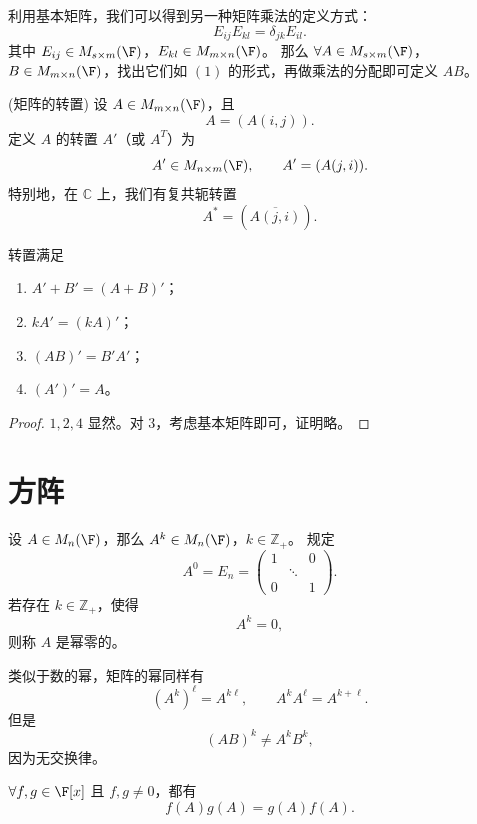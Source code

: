 利用基本矩阵，我们可以得到另一种矩阵乘法的定义方式：
\[
E_{ij}E_{kl}=\delta_{jk}E_{il}.
\]
其中 $E_{ij}\in M_{s\times m}(\F)$，$E_{kl}\in M_{m\times n}(\F)$。
那么 $\forall A\in M_{s\times m}(\F)$，$B\in M_{m\times n}(\F)$，找出它们如 $(1)$ 的形式，再做乘法的分配即可定义 $AB$。
\begin{definition}(矩阵的转置)\label{p1:concept:c3-l683}
	设 $A\in M_{m\times n}(\F)$，且
	\[
	A=(A(i,j)).
	\]
	定义 $A$ 的转置 $A'$（或 $A^T$）为
	\[
	A'\in M_{n\times m}(\F),
	\qquad
	A'=(A(j,i)).
	\]
	特别地，在 $\mathbb C$ 上，我们有复共轭转置
	\[
	A^*=(\overline{A(j,i)}).
	\]
\end{definition}

\begin{proposition}[转置的性质]
	转置满足
	\begin{enumerate}
		\item $A'+B'=(A+B)'$；
		\item $kA'=(kA)'$；
		\item $(AB)'=B'A'$；
		\item $(A')'=A$。
	\end{enumerate}
\end{proposition}

\begin{proof}
	$1,2,4$ 显然。对 $3$，考虑基本矩阵即可，证明略。
\end{proof}


\section{方阵}

\begin{definition}\label{p1:concept:c3-l717}
	设 $A\in M_n(\F)$，那么 $A^k\in M_n(\F)$，$k\in\mathbb Z_+$。
	规定
	\[
	A^0=E_n=
	\begin{pmatrix}
		1&&0\\
		&\ddots&\\
		0&&1
	\end{pmatrix}.
	\]
	若存在 $k\in\mathbb Z_+$，使得
	\[
	A^k=0,
	\]
	则称 $A$ 是幂零的。
	
\end{definition}
类似于数的幂，矩阵的幂同样有
\[
(A^k)^\ell=A^{k\ell},
\qquad
A^kA^\ell=A^{k+\ell}.
\]
但是
\[
(AB)^k\neq A^kB^k,
\]
因为无交换律。
\begin{proposition}
	$\forall f,g\in\F[x]$ 且 $f,g\neq0$，都有
	\[
	f(A)g(A)=g(A)f(A).
	\]
\end{proposition}

